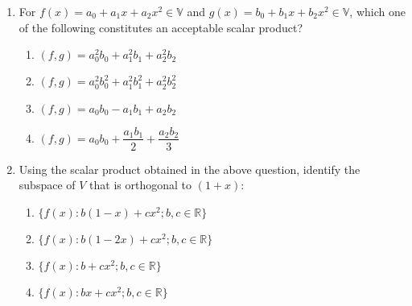 \hfill{}
\begin{enumerate}
\item For $f(x)=a_0 + a_1x + a_2 x^2 \in\mathbb{V}$ and $g(x) = b_0 + b_1 x + b_2  x^2 \in\mathbb{V} $, which one of the following constitutes an acceptable scalar product?
\begin{multicols}{2}
	\begin{enumerate}[itemsep=1ex]
    \item $(f,g)=a_0^2 b_0 + a_1^2 b_1 + a_2^2 b_2$
    \item $(f,g)=a_0^2 b_0^2 + a_1^2 b_1^2 + a_2^2 b_2^2$
    \item $(f,g)=a_0 b_0 - a_1 b_1 + a_2 b_2$
    \item $(f,g)=a_0 b_0 + \dfrac{a_1 b_1}{2} + \dfrac{a_2 b_2}{3}$
\end{enumerate}
\end{multicols}

\item Using the scalar product obtained in the above question, identify the subspace of $V$ that is orthogonal to $(1 + x)$:
\begin{multicols}{2}
\begin{enumerate}
    \item $\{f(x): b(1-x)+c x^2 ; b,c\in\mathbb{R}\}$
    \item $\{f(x): b(1-2x)+c x^2 ; b,c\in\mathbb{R}\}$
    \item $\{f(x):b + c x^2 ; b,c\in\mathbb{R}\}$
    \item $\{f(x): b x + c x^2 ; b,c\in\mathbb{R}\}$
\end{enumerate}
\end{multicols}
\end{enumerate}

